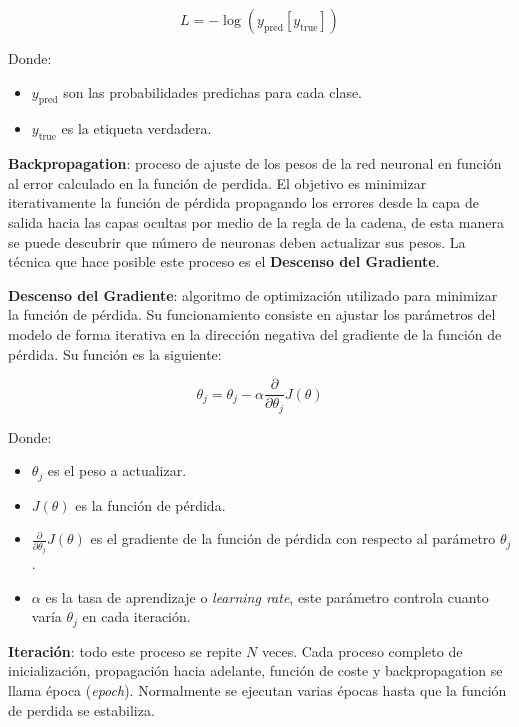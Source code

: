 \begin{equation}
L = - \log(y_{\mathrm{pred}}[y_{\mathrm{true}}])
\end{equation}

Donde:
\begin{itemize}
\tightlist
\item $y_{\mathrm{pred}}$ son las probabilidades predichas para cada clase.
\item $y_{\mathrm{true}}$ es la etiqueta verdadera.
\end{itemize}

\textbf{Backpropagation}: proceso de ajuste de los pesos de la red neuronal en función al error calculado en la función de perdida. El objetivo es minimizar iterativamente la función de pérdida propagando los errores desde la capa de salida hacia las capas ocultas por medio de la regla de la cadena, de esta manera se puede descubrir que número de neuronas deben actualizar sus pesos. La técnica que hace posible este proceso es el \textbf{Descenso del Gradiente}.

\textbf{Descenso del Gradiente}: algoritmo de optimización utilizado para minimizar la función de pérdida. Su funcionamiento consiste en ajustar los parámetros del modelo de forma iterativa en la dirección negativa del gradiente de la función de pérdida. Su función es la siguiente:

\begin{equation}
\theta_{j} = \theta_{j} - \alpha \frac{\partial}{\partial \theta_{j}} J(\theta)
\end{equation}

Donde:
\begin{itemize}
\tightlist
\item $\theta_{j}$ es el peso a actualizar.
\item $J(\theta)$ es la función de pérdida.
\item $\frac{\partial}{\partial \theta_{j}} J(\theta)$ es el gradiente de la función de pérdida con respecto al parámetro $\theta_{j}$.
\item $\alpha$ es la tasa de aprendizaje o \textit{learning rate}, este parámetro controla cuanto varía $\theta_{j}$ en cada iteración.
\end{itemize}

\textbf{Iteración}: todo este proceso se repite $N$ veces. Cada proceso completo de inicialización, propagación hacia adelante, función de coste y backpropagation se llama época (\textit{epoch}). Normalmente se ejecutan varias épocas hasta que la función de perdida se estabiliza.

